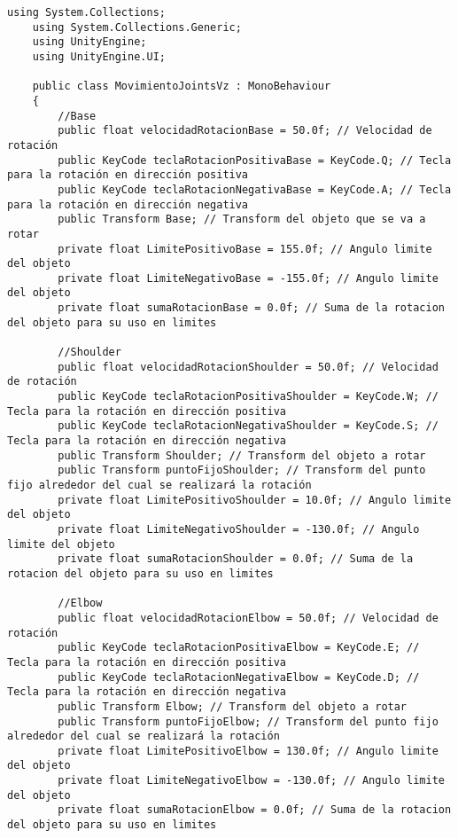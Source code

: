 \begin{lstlisting}[frame=single]
    using System.Collections;
    using System.Collections.Generic;
    using UnityEngine;
    using UnityEngine.UI;

    public class MovimientoJointsVz : MonoBehaviour
    {
        //Base
        public float velocidadRotacionBase = 50.0f; // Velocidad de rotación
        public KeyCode teclaRotacionPositivaBase = KeyCode.Q; // Tecla para la rotación en dirección positiva
        public KeyCode teclaRotacionNegativaBase = KeyCode.A; // Tecla para la rotación en dirección negativa
        public Transform Base; // Transform del objeto que se va a rotar
        private float LimitePositivoBase = 155.0f; // Angulo limite del objeto
        private float LimiteNegativoBase = -155.0f; // Angulo limite del objeto
        private float sumaRotacionBase = 0.0f; // Suma de la rotacion del objeto para su uso en limites

        //Shoulder
        public float velocidadRotacionShoulder = 50.0f; // Velocidad de rotación
        public KeyCode teclaRotacionPositivaShoulder = KeyCode.W; // Tecla para la rotación en dirección positiva
        public KeyCode teclaRotacionNegativaShoulder = KeyCode.S; // Tecla para la rotación en dirección negativa
        public Transform Shoulder; // Transform del objeto a rotar
        public Transform puntoFijoShoulder; // Transform del punto fijo alrededor del cual se realizará la rotación
        private float LimitePositivoShoulder = 10.0f; // Angulo limite del objeto
        private float LimiteNegativoShoulder = -130.0f; // Angulo limite del objeto
        private float sumaRotacionShoulder = 0.0f; // Suma de la rotacion del objeto para su uso en limites

        //Elbow
        public float velocidadRotacionElbow = 50.0f; // Velocidad de rotación
        public KeyCode teclaRotacionPositivaElbow = KeyCode.E; // Tecla para la rotación en dirección positiva
        public KeyCode teclaRotacionNegativaElbow = KeyCode.D; // Tecla para la rotación en dirección negativa
        public Transform Elbow; // Transform del objeto a rotar
        public Transform puntoFijoElbow; // Transform del punto fijo alrededor del cual se realizará la rotación
        private float LimitePositivoElbow = 130.0f; // Angulo limite del objeto
        private float LimiteNegativoElbow = -130.0f; // Angulo limite del objeto
        private float sumaRotacionElbow = 0.0f; // Suma de la rotacion del objeto para su uso en limites


\end{lstlisting}
